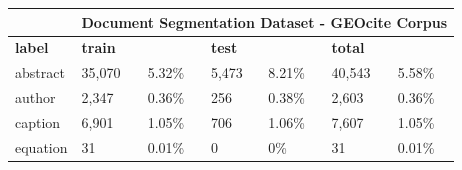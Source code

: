 \begin{table}[!ht]
\centering
\begin{tabular}{l|llllll|}
\cline{2-7}
\multicolumn{1}{c|}{}                & \multicolumn{6}{c|}{Document Segmentation Dataset - GEOcite Corpus}                                                                                                                                                                                                                                                                                                                 \\ \hline
\multicolumn{1}{|l|}{\textbf{label}} & \multicolumn{1}{l|}{\cellcolor[HTML]{DAE8FC}\textbf{train}} & \multicolumn{1}{l|}{\cellcolor[HTML]{EFEFEF}\textbf{}} & \multicolumn{1}{l|}{\cellcolor[HTML]{DAE8FC}\textbf{test}} & \multicolumn{1}{l|}{\cellcolor[HTML]{EFEFEF}\textbf{}} & \multicolumn{1}{l|}{\cellcolor[HTML]{DAE8FC}\textbf{total}} & \cellcolor[HTML]{EFEFEF}\textbf{} \\ \hline
\multicolumn{1}{|l|}{abstract}       & \multicolumn{1}{l|}{\cellcolor[HTML]{DAE8FC}35,070}         & \multicolumn{1}{l|}{\cellcolor[HTML]{EFEFEF}5.32\%}    & \multicolumn{1}{l|}{\cellcolor[HTML]{DAE8FC}5,473}         & \multicolumn{1}{l|}{\cellcolor[HTML]{EFEFEF}8.21\%}    & \multicolumn{1}{l|}{\cellcolor[HTML]{DAE8FC}40,543}         & \cellcolor[HTML]{EFEFEF}5.58\%    \\ \hline
\multicolumn{1}{|l|}{author}         & \multicolumn{1}{l|}{\cellcolor[HTML]{DAE8FC}2,347}          & \multicolumn{1}{l|}{\cellcolor[HTML]{EFEFEF}0.36\%}    & \multicolumn{1}{l|}{\cellcolor[HTML]{DAE8FC}256}           & \multicolumn{1}{l|}{\cellcolor[HTML]{EFEFEF}0.38\%}    & \multicolumn{1}{l|}{\cellcolor[HTML]{DAE8FC}2,603}          & \cellcolor[HTML]{EFEFEF}0.36\%    \\ \hline
\multicolumn{1}{|l|}{caption}        & \multicolumn{1}{l|}{\cellcolor[HTML]{DAE8FC}6,901}          & \multicolumn{1}{l|}{\cellcolor[HTML]{EFEFEF}1.05\%}    & \multicolumn{1}{l|}{\cellcolor[HTML]{DAE8FC}706}           & \multicolumn{1}{l|}{\cellcolor[HTML]{EFEFEF}1.06\%}    & \multicolumn{1}{l|}{\cellcolor[HTML]{DAE8FC}7,607}          & \cellcolor[HTML]{EFEFEF}1.05\%    \\ \hline
\multicolumn{1}{|l|}{equation}       & \multicolumn{1}{l|}{\cellcolor[HTML]{DAE8FC}31}             & \multicolumn{1}{l|}{\cellcolor[HTML]{EFEFEF}0.01\%}    & \multicolumn{1}{l|}{\cellcolor[HTML]{DAE8FC}0}             & \multicolumn{1}{l|}{\cellcolor[HTML]{EFEFEF}0\%}       & \multicolumn{1}{l|}{\cellcolor[HTML]{DAE8FC}31}             & \cellcolor[HTML]{EFEFEF}0.01\%    \\ \hline

\end{tabular}
\end{table}
